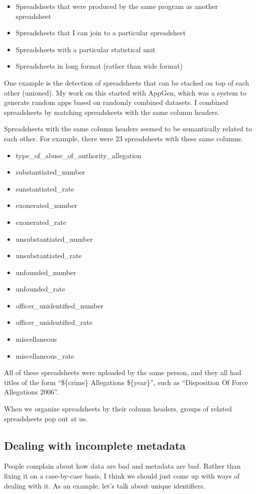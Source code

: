 \documentclass{acm_proc_article-sp}
\begin{document}
\begin{itemize}
\item Spreadsheets that were produced by the same program as another spreadsheet
\item Spreadsheets that I can join to a particular spreadsheet
\item Spreadsheets with a particular statistical unit
\item Spreadsheets in long format (rather than wide format)
\end{itemize}

One example is the detection of spreadsheets that can be stacked on top of
each other (unioned).
My work on this started with AppGen,\cite{appgen} which was a system to
generate random apps based on randomly combined datasets. I combined spreadsheets
by matching spreadsheets with the same column headers.

Spreadsheets with the same column headers seemed to be semantically related to
each other. For example, there were 23 spreadsheets with these same columns.
\begin{itemize}
\item type\_of\_abuse\_of\_authority\_allegation
\item substantiated\_number
\item sunstantiated\_rate
\item exonerated\_number
\item exonerated\_rate
\item unsubstantiated\_number
\item unsubstantiated\_rate
\item unfounded\_number
\item unfounded\_rate
\item officer\_unidentified\_number
\item officer\_unidentified\_rate
\item miscellaneous
\item miscellaneous\_rate
\end{itemize}

All of these spreadsheets were uploaded by the same person, and they all had
titles of the form ``\$\{crime\} Allegations \$\{year\}'', such as
``Disposition Of Force Allegations 2006''.

When we organize spreadsheets by their column headers, groups of related
spreadsheets pop out at us.

\subsection{Dealing with incomplete metadata}
People complain about how data are bad and metadata are bad. Rather than
fixing it on a case-by-case basis, I think we should just come up with ways
of dealing with it. As an example, let's talk about unique identifiers.
\end{document}
